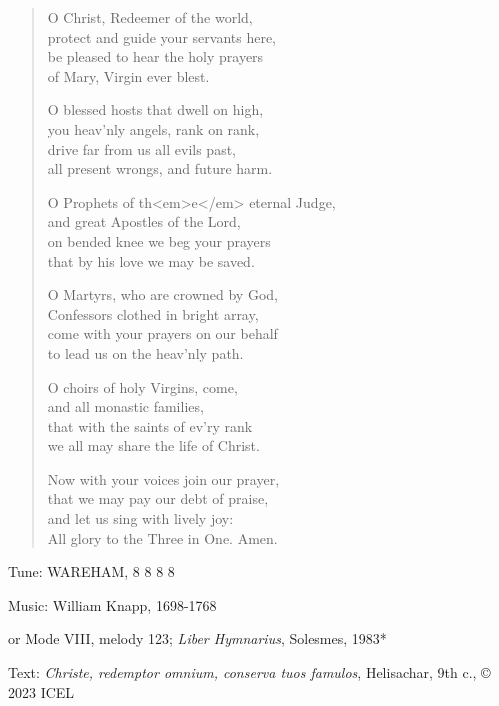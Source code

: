 \hymn

\begin{verse}
O Christ, Redeemer of the world,\\
protect and guide your servants here,\\
be pleased to hear the holy prayers\\
of Mary, Virgin ever blest.

O blessed hosts that dwell on high,\\
you heav’nly angels, rank on rank,\\
drive far from us all evils past,\\
all present wrongs, and future harm.

O Prophets of th<em>e</em> eternal Judge,\\
and great Apostles of the Lord,\\
on bended knee we beg your prayers\\
that by his love we may be saved.

O Martyrs, who are crowned by God,\\
Confessors clothed in bright array,\\
come with your prayers on our behalf\\
to lead us on the heav’nly path.

O choirs of holy Virgins, come,\\
and all monastic families,\\
that with the saints of ev’ry rank\\
we all may share the life of Christ.

Now with your voices join our prayer,\\
that we may pay our debt of praise,\\
and let us sing with lively joy:\\
All glory to the Three in One. Amen.
\end{verse}

\begin{hymnsource}
Tune: WAREHAM, 8 8 8 8

Music: William Knapp, 1698-1768

or Mode VIII, melody 123; \emph{Liber Hymnarius}, Solesmes, 1983*

Text: \emph{Christe, redemptor omnium, conserva tuos famulos}, Helisachar, 9th c., © 2023 ICEL
\end{hymnsource}